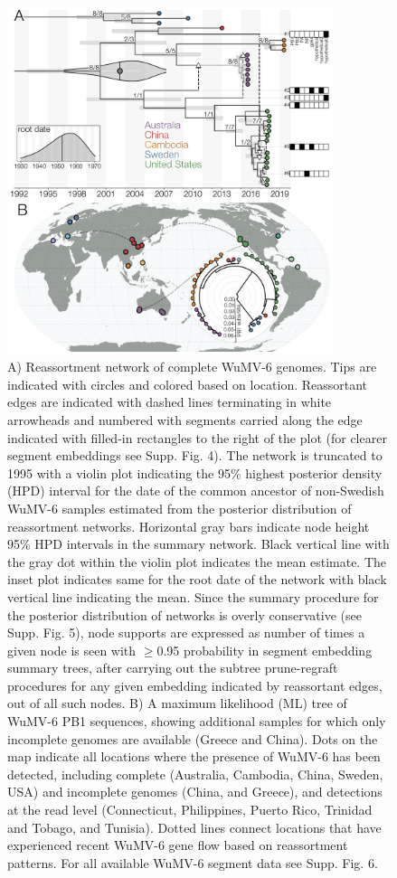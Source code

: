 \documentclass[11pt]{article}
\begin{document}
\begin{figure}
  \centering
  \includegraphics[width=0.85\textwidth]{Fig1_tracking.pdf}
  \caption{
    A) Reassortment network of complete WuMV-6 genomes.
    Tips are indicated with circles and colored based on location.
    Reassortant edges are indicated with dashed lines terminating in white arrowheads and numbered with segments carried along the edge indicated with filled-in rectangles to the right of the plot (for clearer segment embeddings see Supp. Fig. 4).
    The network is truncated to 1995 with a violin plot indicating the 95\% highest posterior density (HPD) interval for the date of the common ancestor of non-Swedish WuMV-6 samples estimated from the posterior distribution of reassortment networks.
    Horizontal gray bars indicate node height 95\% HPD intervals in the summary network.
    Black vertical line with the gray dot within the violin plot indicates the mean estimate.
    The inset plot indicates same for the root date of the network with black vertical line indicating the mean.
    Since the summary procedure for the posterior distribution of networks is overly conservative (see Supp. Fig. 5), node supports are expressed as number of times a given node is seen with $\geq$0.95 probability in segment embedding summary trees, after carrying out the subtree prune-regraft procedures for any given embedding indicated by reassortant edges, out of all such nodes.
    B) A maximum likelihood (ML) tree of WuMV-6 PB1 sequences, showing additional samples for which only incomplete genomes are available (Greece and China).
    Dots on the map indicate all locations where the presence of WuMV-6 has been detected, including complete (Australia, Cambodia, China, Sweden, USA) and incomplete genomes (China, and Greece), and detections at the read level (Connecticut, Philippines, Puerto Rico, Trinidad and Tobago, and Tunisia).
    Dotted lines connect locations that have experienced recent WuMV-6 gene flow based on reassortment patterns.
    For all available WuMV-6 segment data see Supp. Fig. 6.
    }
    \label{fig:tracking}
\end{figure}
\end{document}
